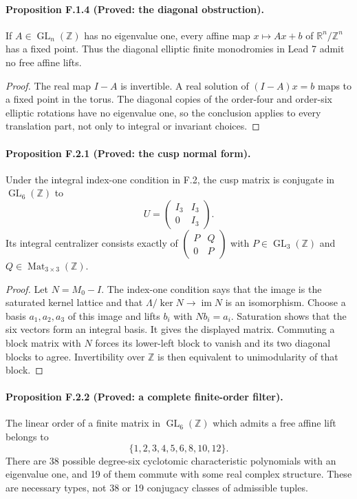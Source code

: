 \paragraph{Proposition F.1.4 (Proved: the diagonal obstruction).}
If $A\in\operatorname{GL}_n(\mathbb Z)$ has no eigenvalue one,
every affine map $x\mapsto Ax+b$ of $\mathbb R^n/\mathbb Z^n$
has a fixed point.  Thus the diagonal elliptic finite monodromies
in Lead 7 admit no free affine lifts.

\begin{proof}
The real map $I-A$ is invertible.  A real solution of
$(I-A)x=b$ maps to a fixed point in the torus.  The diagonal
copies of the order-four and order-six elliptic rotations have
no eigenvalue one, so the conclusion applies to every translation
part, not only to integral or invariant choices.
\end{proof}

\paragraph{Proposition F.2.1 (Proved: the cusp normal form).}
Under the integral index-one condition in F.2, the cusp matrix is
conjugate in $\operatorname{GL}_6(\mathbb Z)$ to
\[
 U=\begin{pmatrix}I_3&I_3\\0&I_3\end{pmatrix}.
\]
Its integral centralizer consists exactly of
$\left(\begin{smallmatrix}P&Q\\0&P\end{smallmatrix}\right)$
with $P\in\operatorname{GL}_3(\mathbb Z)$ and
$Q\in\operatorname{Mat}_{3\times3}(\mathbb Z)$.

\begin{proof}
Let $N=M_0-I$.  The index-one condition says that the image
is the saturated kernel lattice and that
$\Lambda/\ker N\to\operatorname{im}N$ is an isomorphism.
Choose a basis $a_1,a_2,a_3$ of this image and lifts $b_i$ with
$Nb_i=a_i$.  Saturation shows that the six vectors form an
integral basis.  It gives the displayed matrix.  Commuting a
block matrix with $N$ forces its lower-left block to vanish
and its two diagonal blocks to agree.  Invertibility over
$\mathbb Z$ is then equivalent to unimodularity of that block.
\end{proof}

\paragraph{Proposition F.2.2 (Proved: a complete finite-order filter).}
The linear order of a finite matrix in $\operatorname{GL}_6(\mathbb Z)$
which admits a free affine lift belongs to
\[
 \{1,2,3,4,5,6,8,10,12\}.
 \tag{F.3}
\]
There are 38 possible degree-six cyclotomic characteristic
polynomials with an eigenvalue one, and 19 of them commute
with some real complex structure.  These are necessary types,
not 38 or 19 conjugacy classes of admissible tuples.

